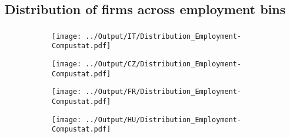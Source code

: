 \documentclass[12pt,notitlepage]{article}
\begin{document}
\begin{table}[!htpb]
    \centering
    \caption{France}
    \label{tab:my_label}
\end{table}

\begin{table}[!htpb]
    \centering
    \caption{Hungary}
    \label{tab:my_label}
\end{table}

\begin{table}[!htpb]
    \centering
    \caption{Czech Republic}
    \label{tab:my_label}
\end{table}
\pagebreak



\subsection{Distribution of firms across employment bins}

\subsubsection{}
\begin{figure}[!htpb]
\centering
\caption{Distribution of firms across employment bins}
\begin{subfigure}{.49\textwidth}
    \centering
 \texttt{[image: ../Output/IT/Distribution\_Employment-Compustat.pdf]}
\end{subfigure}%
\begin{subfigure}{.49\textwidth}
    \centering
 \texttt{[image: ../Output/CZ/Distribution\_Employment-Compustat.pdf]}
\end{subfigure}
\begin{subfigure}{.49\textwidth}
    \centering
 \texttt{[image: ../Output/FR/Distribution\_Employment-Compustat.pdf]}
\end{subfigure}%
\begin{subfigure}{.49\textwidth}
    \centering
 \texttt{[image: ../Output/HU/Distribution\_Employment-Compustat.pdf]}
\end{subfigure}
\end{figure}
\pagebreak
\end{document}
